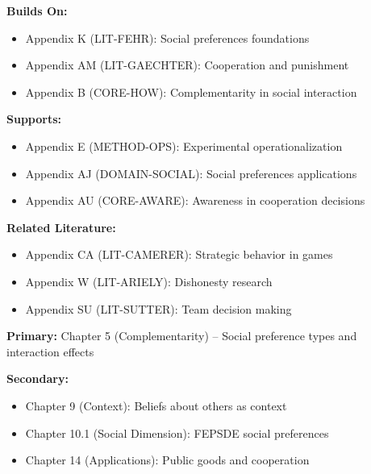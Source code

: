 \begin{tcolorbox}[colback=blue!5!white,colframe=blue!75!black,title=Cross-Reference Map]
\textbf{Builds On:}
\begin{itemize}
    \item Appendix K (LIT-FEHR): Social preferences foundations
    \item Appendix AM (LIT-GAECHTER): Cooperation and punishment
    \item Appendix B (CORE-HOW): Complementarity in social interaction
\end{itemize}

\textbf{Supports:}
\begin{itemize}
    \item Appendix E (METHOD-OPS): Experimental operationalization
    \item Appendix AJ (DOMAIN-SOCIAL): Social preferences applications
    \item Appendix AU (CORE-AWARE): Awareness in cooperation decisions
\end{itemize}

\textbf{Related Literature:}
\begin{itemize}
    \item Appendix CA (LIT-CAMERER): Strategic behavior in games
    \item Appendix W (LIT-ARIELY): Dishonesty research
    \item Appendix SU (LIT-SUTTER): Team decision making
\end{itemize}
\end{tcolorbox}

\begin{tcolorbox}[colback=green!5!white,colframe=green!75!black,title=Chapter Linkage]
\textbf{Primary:} Chapter 5 (Complementarity) -- Social preference types and interaction effects

\textbf{Secondary:}
\begin{itemize}
    \item Chapter 9 (Context): Beliefs about others as context
    \item Chapter 10.1 (Social Dimension): FEPSDE social preferences
    \item Chapter 14 (Applications): Public goods and cooperation
\end{itemize}
\end{tcolorbox}

